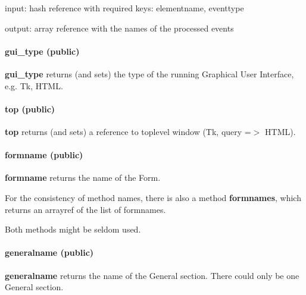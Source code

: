 input: hash reference with required keys: elementname, eventtype



output: array reference with the names of the processed events

\paragraph*{gui\_type (public)\label{Apiis::Form::Init_--_base_package_for_Form_objects_of_all_types_gui_type_public_}}


\textbf{gui\_type} returns (and sets) the type of the running Graphical User
Interface, e.g. Tk, HTML.

\paragraph*{top (public)\label{Apiis::Form::Init_--_base_package_for_Form_objects_of_all_types_top_public_}}


\textbf{top} returns (and sets) a reference to toplevel window (Tk, query =$>$ HTML).

\paragraph*{formname (public)\label{Apiis::Form::Init_--_base_package_for_Form_objects_of_all_types_formname_public_}}


\textbf{formname} returns the name of the Form.



For the consistency of method names, there is also a method \textbf{formnames},
which returns an arrayref of the list of formnames.



Both methods might be seldom used.

\paragraph*{generalname (public)\label{Apiis::Form::Init_--_base_package_for_Form_objects_of_all_types_generalname_public_}}


\textbf{generalname} returns the name of the General section. There could only be
one General section.



